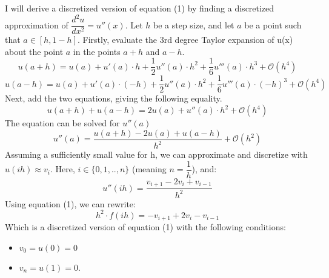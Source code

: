 \documentclass[11pt]{article} %
\begin{document}
I will derive a discretized version of equation (1) by finding a discretized approximation of \(\dfrac{d^2u}{dx^2}=u''(x)\).  
Let \(h\) be a step size, and let \(a\) be a point such that \(a \in [h, 1-h]\). Firstly, evaluate the 3rd degree Taylor expansion of u(x) about the point \(a\) in the points \(a+h\) and \(a-h\).
\[u(a+h) =u(a) + u'(a)\cdot h + \dfrac{1}{2}u''(a) \cdot h^2 + \dfrac{1}{6}u'''(a) \cdot h^3 + \mathcal{O}(h^4) \]
\[u(a-h) =u(a) + u'(a)\cdot (-h) + \dfrac{1}{2}u''(a) \cdot h^2 + \dfrac{1}{6}u'''(a) \cdot (-h)^3 + \mathcal{O}(h^4) \]
Next, add the two equations, giving the following equality.
\[ u(a+h) + u(a-h) = 2u(a) + u''(a)\cdot h^2 + \mathcal{O}(h^4) \]
The equation can be solved for \(u''(a)\)
\[u''(a) = \dfrac{u(a+h) - 2u(a) +u(a-h)}{h^2} + \mathcal{O}(h^2) \]
Assuming a sufficiently small value for h, we can approximate and discretize with \(u(ih) \approx v_i\). Here, \(i \in \{0, 1, .., n\}\) (meaning \(n=\dfrac{1}{h}\)), and:
\[u''(ih) = \dfrac{v_{i+1} - 2v_i +v_{i-1}}{h^2} \]
Using equation (1), we can rewrite:
\begin{equation}h^2 \cdot f(ih) = -v_{i+1} + 2v_i - v_{i-1}\end{equation}
Which is a discretized version of equation (1) with the following conditions:
\begin{itemize}
	\item \(v_0=u(0)=0\) 
	\item \(v_{n}=u(1)=0\).
\end{itemize}
\end{document}
